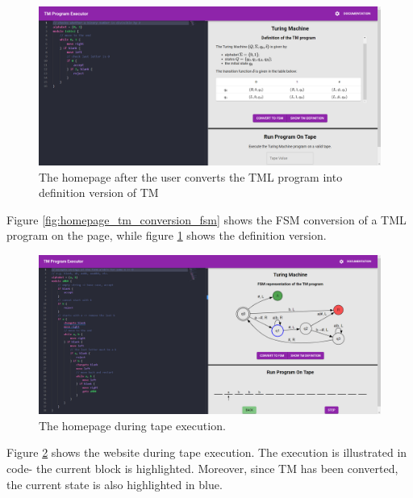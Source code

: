 \begin{appendices}
\begin{figure}[htb]
    \centering
    \includegraphics[scale=0.18]{images/Homepage w. TM (def).png}
    \caption{The homepage after the user converts the TML program into definition version of TM}
    \label{fig:homepage_tm_conversion_def}
\end{figure}

Figure \ref{fig:homepage_tm_conversion_fsm} shows the FSM conversion of a TML program on the page, while figure \ref{fig:homepage_tm_conversion_def} shows the definition version.

\begin{figure}[htb]
    \centering
    \includegraphics[scale=0.18]{images/Homepage execution start.png}
    \caption{The homepage during tape execution.}
    \label{fig:homepage_execution_start}
\end{figure}

Figure \ref{fig:homepage_execution_start} shows the website during tape execution. The execution is illustrated in code- the current block is highlighted. Moreover, since TM has been converted, the current state is also highlighted in blue.

\newpage


\end{appendices}
